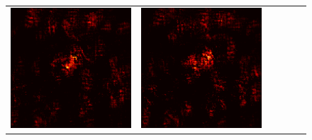 \documentclass[preprint,12pt]{elsarticle}
\begin{document}
\begin{figure}[p]
\begin{tabular}{cccccc}
  \includegraphics[scale=\scale]{../visualizations/examples/imagenette/cnn/active_saliency_map/0.png} & 
  \includegraphics[scale=\scale]{../visualizations/examples/imagenette/cnn/inactive_saliency_map/0.png} \\
  

\end{tabular}
\end{figure}
\end{document}
